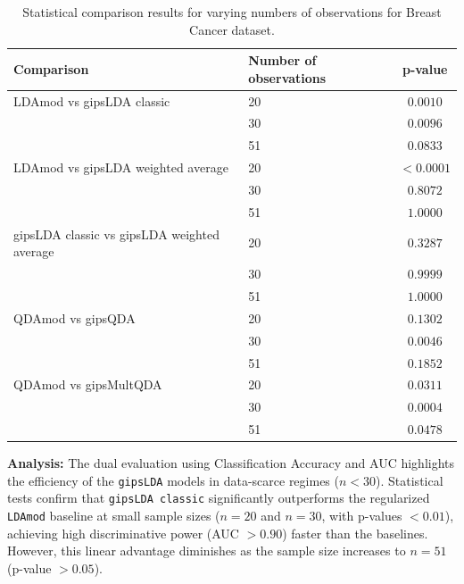 \documentclass[a4paper,11pt,twoside]{report}
\theoremstyle{definition}
\begin{document}
\begin{table}[H]
    \centering
    \begin{tabular}{llc}
        \toprule
        \textbf{Comparison} & \textbf{Number of observations} & \textbf{p-value} \\
        \midrule
        LDAmod vs gipsLDA classic & 20 & $0.0010$ \\
                                  & 30 & $0.0096$ \\
                                  & 51 & $0.0833$ \\
        \midrule
        LDAmod vs gipsLDA weighted average & 20 & $<0.0001$ \\
                                           & 30 & $0.8072$ \\
                                           & 51 & $1.0000$ \\
        \midrule
        gipsLDA classic vs gipsLDA weighted average & 20 & $0.3287$ \\
                                                    & 30 & $0.9999$ \\
                                                    & 51 & $1.0000$ \\
        \midrule
        QDAmod vs gipsQDA & 20 & $0.1302$ \\
                          & 30 & $0.0046$ \\
                          & 51 & $0.1852$ \\
        \midrule
        QDAmod vs gipsMultQDA & 20 & $0.0311$ \\
                              & 30 & $0.0004$ \\
                              & 51 & $0.0478$ \\
        \bottomrule
    \end{tabular}
    \caption{Statistical comparison results for varying numbers of observations for Breast Cancer dataset.}
    \label{tab:stat_comparison_obs_breast}
\end{table}

\textbf{Analysis:}
The dual evaluation using Classification Accuracy and AUC highlights the efficiency of the \texttt{gipsLDA} models in data-scarce regimes ($n < 30$). Statistical tests confirm that \texttt{gipsLDA classic} significantly outperforms the regularized \texttt{LDAmod} baseline at small sample sizes ($n=20$ and $n=30$, with p-values $< 0.01$), achieving high discriminative power (AUC $> 0.90$) faster than the baselines. However, this linear advantage diminishes as the sample size increases to $n=51$ (p-value $> 0.05$).
\end{document}
